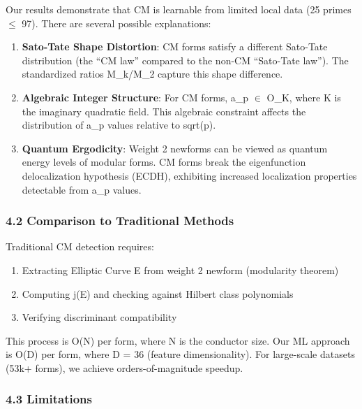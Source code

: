 \documentclass[
]{article}
\providecommand{\tightlist}{%
  \setlength{\itemsep}{0pt}\setlength{\parskip}{0pt}}
\begin{document}
Our results demonstrate that CM is learnable from limited local data (25
primes $\le$ 97). There are several possible explanations:

\begin{enumerate}
\def\labelenumi{\arabic{enumi}.}
\item
  \textbf{Sato-Tate Shape Distortion}: CM forms satisfy a different
  Sato-Tate distribution (the ``CM law'' compared to the non-CM
  ``Sato-Tate law''). The standardized ratios M\_k/M\_2 capture this
  shape difference.
\item
  \textbf{Algebraic Integer Structure}: For CM forms, a\_p $\in$ O\_K, where
  K is the imaginary quadratic field. This algebraic constraint affects
  the distribution of a\_p values relative to sqrt(p).
\item
  \textbf{Quantum Ergodicity}: Weight 2 newforms can be viewed as
  quantum energy levels of modular forms. CM forms break the
  eigenfunction delocalization hypothesis (ECDH), exhibiting increased
  localization properties detectable from a\_p values.
\end{enumerate}

\hypertarget{comparison-to-traditional-methods}{%
\subsubsection{4.2 Comparison to Traditional
Methods}\label{comparison-to-traditional-methods}}

Traditional CM detection requires:

\begin{enumerate}
\def\labelenumi{\arabic{enumi}.}
\tightlist
\item
  Extracting Elliptic Curve E from weight 2 newform (modularity theorem)
\item
  Computing j(E) and checking against Hilbert class polynomials
\item
  Verifying discriminant compatibility
\end{enumerate}

This process is O(N) per form, where N is the conductor size. Our ML
approach is O(D) per form, where D = 36 (feature dimensionality). For
large-scale datasets (53k+ forms), we achieve orders-of-magnitude
speedup.

\hypertarget{limitations}{%
\subsubsection{4.3 Limitations}\label{limitations}}
\end{document}
